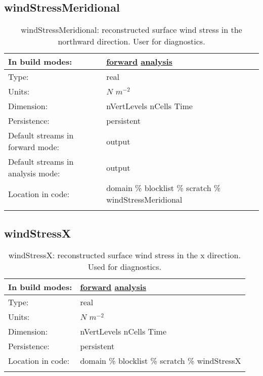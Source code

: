 \subsection[windStressMeridional]{windStressMeridional}
\label{subsec:var_sec_scratch_windStressMeridional}
\begin{center}
\begin{longtable}{| p{2.0in} | p{4.0in} |}
        \hline 
        In build modes: & \hyperref[subsec:forward_var_tab_scratch]{forward} \hyperref[subsec:analysis_var_tab_scratch]{analysis} \\
        \hline 
        Type: & real \\
        \hline 
        Units: & $N$ $m^{-2}$ \\
        \hline 
        Dimension: & nVertLevels nCells Time \\
        \hline 
        Persistence: & persistent \\
        \hline 
		 Default streams in forward mode: &  output \\
        \hline 
		 Default streams in analysis mode: &  output \\
        \hline 
		 Location in code: & domain \% blocklist \% scratch \% windStressMeridional \\
		 \hline 
    \caption{windStressMeridional: reconstructed surface wind stress in the northward direction. User for diagnostics.}
\end{longtable}
\end{center}
\subsection[windStressX]{windStressX}
\label{subsec:var_sec_scratch_windStressX}
\begin{center}
\begin{longtable}{| p{2.0in} | p{4.0in} |}
        \hline 
        In build modes: & \hyperref[subsec:forward_var_tab_scratch]{forward} \hyperref[subsec:analysis_var_tab_scratch]{analysis} \\
        \hline 
        Type: & real \\
        \hline 
        Units: & $N$ $m^{-2}$ \\
        \hline 
        Dimension: & nVertLevels nCells Time \\
        \hline 
        Persistence: & persistent \\
        \hline 
		 Location in code: & domain \% blocklist \% scratch \% windStressX \\
		 \hline 
    \caption{windStressX: reconstructed surface wind stress in the x direction. Used for diagnostics.}
\end{longtable}
\end{center}
